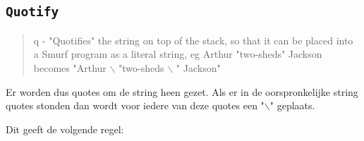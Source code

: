 \subsection{\texttt{Quotify}}
\label{sec:rules:quotify}

\begin{quote}
q - "Quotifies" the string on top of the stack,      so that it can be placed
    into a Smurf program as a literal string, eg
    Arthur "two-sheds" Jackson
    becomes
    "Arthur $\backslash$ "two-sheds $\backslash$ " Jackson"
\end{quote}


Er worden dus quotes om de string heen gezet. Als er in de oorspronkelijke string quotes stonden dan wordt voor iedere van deze quotes een "$\backslash$" geplaats. 

Dit geeft de volgende regel:

